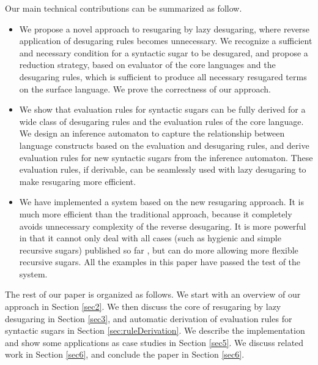 Our main technical contributions can be summarized as follow.
\begin{itemize}
\item We propose a novel approach to resugaring by lazy desugaring, where reverse application of desugaring rules becomes unnecessary. We recognize a sufficient and necessary condition for a syntactic sugar to be desugared, and propose a reduction strategy, based on evaluator of the core languages and the desugaring rules, which is sufficient to produce all necessary resugared terms on the surface language. We prove the correctness of our approach.



\item We show that evaluation rules for syntactic sugars can be fully derived for a wide  class of desugaring rules and the evaluation rules of the core language. We design an inference automaton to capture the relationship between language constructs based on   the evaluation and desugaring rules, and derive evaluation rules for new syntactic sugars from the inference automaton. These evaluation rules, if derivable, can be seamlessly used with lazy desugaring to make resugaring more efficient.



\item We have implemented a system based on the new resugaring approach. It is much more efficient than the traditional approach, because it completely avoids unnecessary complexity of the reverse desugaring. It is more powerful in that it cannot only deal with all cases (such as hygienic and simple recursive sugars) published so far \cite{resugaring,hygienic}, but can do more allowing more flexible recursive sugars. All the examples in this paper have passed the test of the system.


\end{itemize}

The rest of our paper is organized as follows. We start with an overview of our approach in Section \ref{sec2}. We then discuss the core of resugaring by lazy desugaring in Section \ref{sec3}, and automatic derivation of evaluation rules for syntactic sugars in Section \ref{sec:ruleDerivation}. We describe the implementation and show some applications as case studies in Section \ref{sec5}. We discuss related  work in Section \ref{sec6}, and conclude the paper in Section \ref{sec6}.
